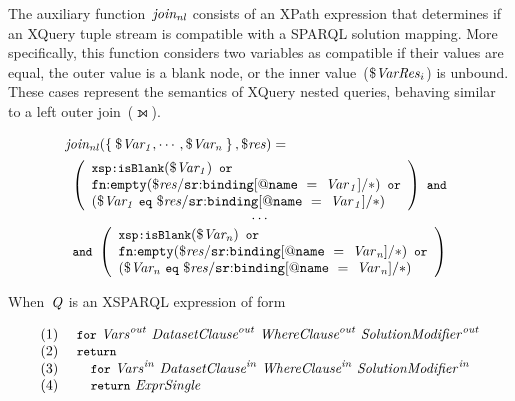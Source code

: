 %
The auxiliary function~$\mathit{join_{nl}}$ consists of an XPath expression that determines if an XQuery tuple stream
is compatible with a SPARQL solution mapping. 
%
More specifically, this function considers two variables as compatible if their values are equal, the outer value is a
blank node, or the inner value~($\$\mathit{VarRes}_{i}$) is unbound.
%
These cases represent the semantics of XQuery nested queries, behaving similar to a left outer join~($\leftouterjoin$).

\begin{small}
\begin{equation*}
\begin{array}{l}
  \mathit{join_{nl}}\!\left(\left\{\: \$\mathit{Var_1}, \dotsb, \$\mathit{Var_n} \:\right\}, \$\mathit{res}\right) = \\[.5em]
  \begin{array}{c}
    \left(
      \begin{array}{l}
        \texttt{{\small \texttt{{\small xsp{:}}}isBlank}}\!\left(\$\mathit{Var_1}\right)~\texttt{{\small or}} \\
        \mathit{\mathtt{fn{:}empty}}\!\left(\$\mathit{res}/\mathtt{sr{:}binding}\mathtt{[@name~=~\mathit{{Var}_{1}}]/*}\right)~\texttt{{\small or}}\\
        \left( \$\mathit{Var_1}~\texttt{{\small eq}}~\$\mathit{res}/\mathtt{sr{:}binding[@name~=~\mathit{{Var}_{1}}]/*} \right)
      \end{array}
    \right)~\texttt{{\small and}} \\ 
     \dotsb \\
    \texttt{{\small and}}~\left(\begin{array}{l}
        \texttt{{\small \texttt{{\small xsp{:}}}isBlank}}\!\left(\$\mathit{Var_n}\right)~\texttt{{\small or}}\\
        \mathit{\mathtt{fn{:}empty}}\!\left(\$\mathit{res}/\mathtt{sr{:}binding[@name~=~\mathit{{Var}_{n}}]/*}\right)~\texttt{{\small or}}\\
        \left( \$\mathit{Var_n}~\texttt{{\small eq}}~\$\mathit{res}/\mathtt{sr{:}binding[@name~=~\mathit{{Var}_{n}}]/*} \right)
    \end{array}
  \right) \\
  \end{array}
\end{array}
\end{equation*}
\end{small}%
%
When~$\mathit{{Q}_{}}$ is an XSPARQL expression of form
\begin{queryF}
\[\begin{array}{l}
  \mathrm{(1)~~~~}\texttt{{\small for}}~{\mathit{\mathit{Vars}}}_{\mathit{}}^{\mathit{out}}~{\mathit{{\textit{Da\-ta\-set\-Clau\-se}}}}_{\mathit{}}^{\mathit{out}}~{\mathit{{\textit{Whe\-re\-Clause}}}}_{\mathit{}}^{\mathit{out}}~{\mathit{SolutionModifier}}_{\mathit{}}^{\mathit{out}}\\
  \mathrm{(2)~~~~}\texttt{{\small return}}\\
  \mathrm{(3)~~~~}\quad\texttt{{\small for}}~{\mathit{\mathit{Vars}}}_{\mathit{}}^{\mathit{in}}~{\mathit{{\textit{Da\-ta\-set\-Clau\-se}}}}_{\mathit{}}^{\mathit{in}}~{\mathit{{\textit{Whe\-re\-Clause}}}}_{\mathit{}}^{\mathit{in}}~{\mathit{SolutionModifier}}_{\mathit{}}^{\mathit{in}}\\
  \mathrm{(4)~~~~}\quad\texttt{{\small return}}~{\textit{Expr\-Single}}
\end{array}\]
\label{eq:expr_sdep}
\end{queryF}%
